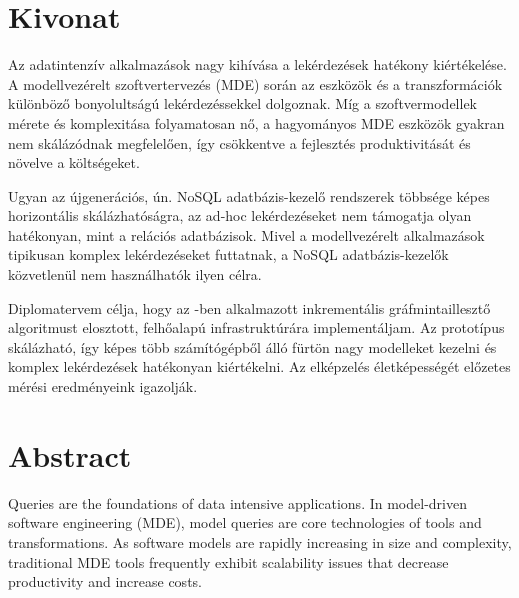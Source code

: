 \chapter*{Kivonat}

\cite{Izso:2013:IIG:2487766.2487772}
\cite{4store}

Az adatintenzív alkalmazások nagy kihívása a lekérdezések hatékony kiértékelése. A modellvezérelt szoftvertervezés (MDE) során az eszközök és a transzformációk különböző bonyolultságú lekérdezéssekkel dolgoznak. Míg a szoftvermodellek mérete és komplexitása folyamatosan nő, a hagyományos MDE eszközök gyakran nem skálázódnak megfelelően, így csökkentve a fejlesztés produktivitását és növelve a költségeket.

Ugyan az újgenerációs, ún. NoSQL adatbázis-kezelő rendszerek többsége képes horizontális skálázhatóságra, az ad-hoc lekérdezéseket nem támogatja olyan hatékonyan, mint a relációs adatbázisok. Mivel a modellvezérelt alkalmazások tipikusan komplex lekérdezéseket futtatnak, a NoSQL adatbázis-kezelők közvetlenül nem használhatók ilyen célra.

Diplomatervem célja, hogy az \incquery{}-ben alkalmazott inkrementális gráfmintaillesztő algoritmust elosztott, felhőalapú infrastruktúrára implementáljam. Az \incqueryD{} prototípus skálázható, így képes több számítógépből álló fürtön nagy modelleket kezelni és komplex lekérdezések hatékonyan kiértékelni. Az elképzelés életképességét előzetes mérési eredményeink igazolják.

\vfill

\chapter*{Abstract}

Queries are the foundations of data intensive applications. In model-driven software engineering (MDE), model queries are core technologies of tools and transformations. As software models are rapidly increasing in size and complexity, traditional MDE tools frequently exhibit scalability issues that decrease productivity and increase costs.

